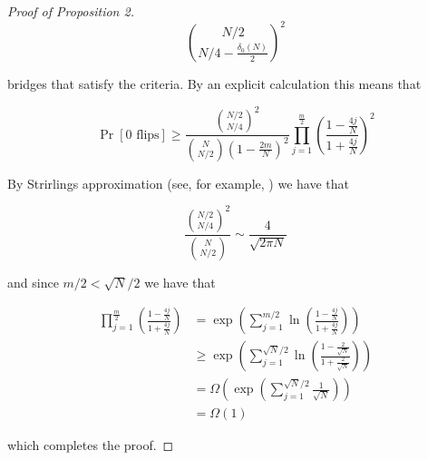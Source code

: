 \documentclass{article}
\theoremstyle{definition}
\begin{document}
\begin{proof}[Proof of Proposition 2]
$${N/2 \choose N/4-\frac{\delta_0(N)}{2}}^2$$

bridges that satisfy the criteria. By an explicit calculation this means that

\begin{equation*}
\Pr[0\,\,\mathrm{flips}]\geq \frac{{N/2 \choose N/4}^2}{{N \choose N/2}\left(1-\frac{2m}{N}\right)^{2}} \prod_{j=1}^{\frac{m}{2}}\left(\frac{1-\frac{4j}{N}}{1+\frac{4j}{N}}\right)^{2}
\end{equation*}

By Strirlings approximation (see, for example, \cite{eger2014stirling}) we have that

$$\frac{{N/2 \choose N/4}^2}{{N \choose N/2}}\sim \frac{4}{\sqrt{2\pi N}}$$

and since $m/2<\sqrt{N}/2$ we have that

\begin{align*}
\prod_{j=1}^{\frac{m}{2}}\left(\frac{1-\frac{4j}{N}}{1+\frac{4j}{N}}\right)&=\exp\left(\sum_{j=1}^{m/2}\ln\left(\frac{1-\frac{4j}{N}}{1+\frac{4j}{N}}\right)\right)\\
&\geq \exp\left(\sum_{j=1}^{\sqrt{N}/2}\ln\left(\frac{1-\frac{2}{\sqrt{N}}}{1+\frac{2}{\sqrt{N}}}\right)\right)\\
&=\Omega\left( \exp\left(\sum_{j=1}^{\sqrt{N}/2}\frac{1}{\sqrt{N}}\right)\right)\\
&=\Omega(1)
\end{align*}

which completes the proof.






\end{proof}



\end{document}
